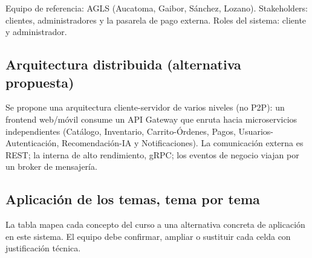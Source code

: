 \documentclass[11pt]{article}
\begin{document}
Equipo de referencia: AGLS (Aucatoma, Gaibor, Sánchez, Lozano). Stakeholders: clientes, administradores y la pasarela de pago externa. Roles del sistema: cliente y administrador.

\subsection{Arquitectura distribuida (alternativa propuesta)}
Se propone una arquitectura cliente-servidor de varios niveles (no P2P): un frontend web/móvil consume un API Gateway que enruta hacia microservicios independientes (Catálogo, Inventario, Carrito-Órdenes, Pagos, Usuarios-Autenticación, Recomendación-IA y Notificaciones). La comunicación externa es REST; la interna de alto rendimiento, gRPC; los eventos de negocio viajan por un broker de mensajería.

\subsection{Aplicación de los temas, tema por tema}
La tabla mapea cada concepto del curso a una alternativa concreta de aplicación en este sistema. El equipo debe confirmar, ampliar o sustituir cada celda con justificación técnica.
\end{document}
